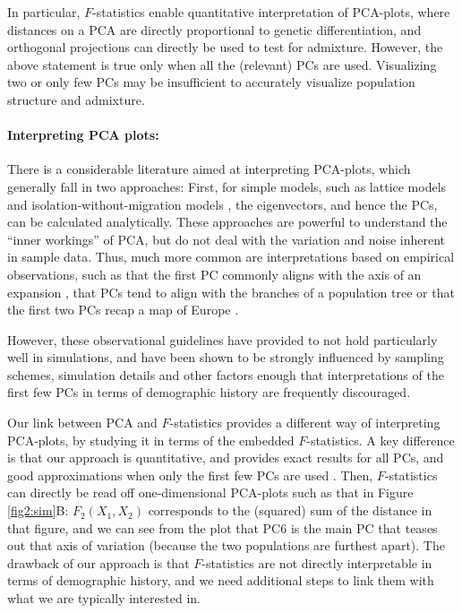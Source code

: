 \documentclass[12pt, letterpaper]{article}
\begin{document}
In particular, $F$-statistics enable quantitative interpretation of PCA-plots, where distances on a PCA are directly proportional to genetic differentiation, and orthogonal projections can directly be used to test for admixture.
However, the above statement is true only when all the (relevant) PCs are used. Visualizing two or only few PCs may be insufficient to accurately visualize population structure and admixture. 

\paragraph{Interpreting PCA plots:}
There is a considerable literature aimed at interpreting PCA-plots, which generally fall in two approaches: First, for simple models, such as lattice models \cite{novembre_interpreting_2008} and isolation-without-migration models \cite{mcvean_genealogical_2009}, the eigenvectors, and hence the PCs, can be calculated analytically. These approaches are powerful to understand the ``inner workings'' of PCA, but do not deal with the variation and noise inherent in sample data. Thus, much more common are interpretations based on empirical observations, such as that the first PC commonly aligns with the axis of an expansion \cite{l_l_cavalli-sforza_history_1996}, that PCs tend to align with the branches of a population tree or that the first two PCs recap a map of Europe \citep{novembre_genes_2008, cavalli-sforza_analysis_1975}.

However, these observational guidelines have provided to not hold particularly well in simulations, and have been shown to be strongly influenced by sampling schemes, simulation details and other factors \citep{novembre_interpreting_2008, degiorgio_geographic_2013, elhaik_principal_2022, jay_anisotropic_2013} enough that interpretations of the first few PCs in terms of demographic history are frequently discouraged.

Our link between PCA and $F$-statistics provides a different way of interpreting PCA-plots, by studying it in terms of the embedded $F$-statistics. A key difference is that our approach is quantitative, and provides exact results for all PCs, and good approximations when only the first few PCs are used \cite{peter_geometric_2022}. Then, $F$-statistics can directly be read off one-dimensional PCA-plots such as that in Figure \ref{fig2:sim}B: $F_2(X_1, X_2)$ corresponds to the (squared) sum of the distance in that figure, and we can see from the plot that PC6 is the main PC that teases out that axis of variation (because the two populations are furthest apart).  
The drawback of our approach is that $F$-statistics are not directly interpretable in terms of demographic history, and we need additional steps to link them with what we are typically interested in. 
\end{document}
